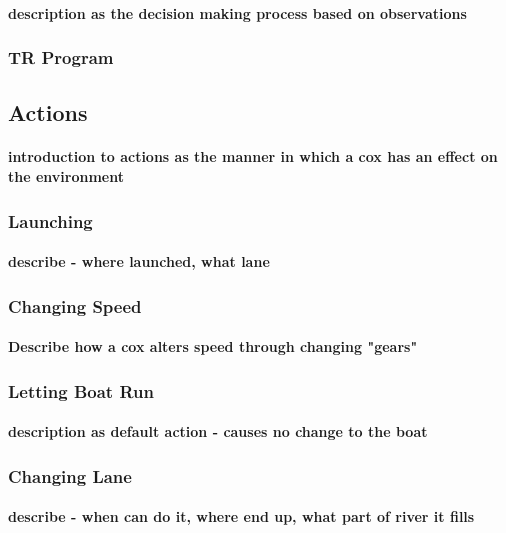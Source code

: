       \paragraph{description as the decision making process based on observations}
      \subsubsection{TR Program}
    
    \subsection{Actions}
      \paragraph{introduction to actions as the manner in which a cox has an effect on the environment}
      \subsubsection{Launching}
        \paragraph{describe - where launched, what lane}
      \subsubsection{Changing Speed}
        \paragraph{Describe how a cox alters speed through changing "gears"}
      \subsubsection{Letting Boat Run}
        \paragraph{description as default action - causes no change to the boat}
      \subsubsection{Changing Lane}
        \paragraph{describe - when can do it, where end up, what part of river it fills}
